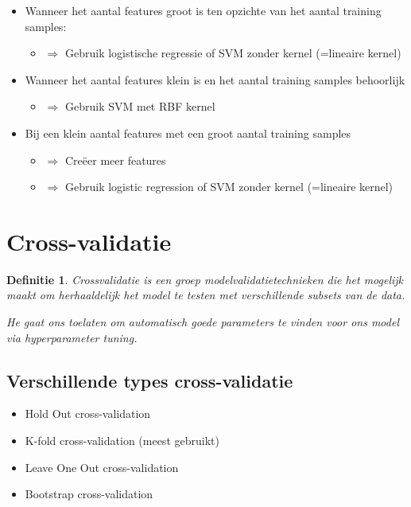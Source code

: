 \documentclass{article}
\newtheorem{theorem}{Definitie}[section]
\begin{document}
\begin{itemize}
    \item Wanneer het aantal features groot is ten opzichte van het aantal training samples:
    \begin{itemize}
        \item $\Rightarrow$ Gebruik logistische regressie of SVM zonder kernel (=lineaire kernel)
    \end{itemize}
    \item Wanneer het aantal features klein is en het aantal training samples behoorlijk
    \begin{itemize}
        \item $\Rightarrow$ Gebruik SVM met RBF kernel
    \end{itemize} 
    \item Bij een klein aantal features met een groot aantal training samples
    \begin{itemize}
        \item $\Rightarrow$ Creëer meer features
        \item $\Rightarrow$ Gebruik logistic regression of SVM zonder kernel (=lineaire kernel)
    \end{itemize} 
\end{itemize}

\section{Cross-validatie}

\begin{theorem}
    Crossvalidatie is een groep modelvalidatietechnieken die het mogelijk maakt om
    herhaaldelijk het model te testen met verschillende subsets van de data.

    He gaat ons toelaten om automatisch goede parameters te vinden voor ons model via hyperparameter tuning.
\end{theorem}


\subsection{Verschillende types cross-validatie}

\begin{itemize}
    \item Hold Out cross-validation
    \item K-fold cross-validation (meest gebruikt)
    \item Leave One Out cross-validation
    \item Bootstrap cross-validation
\end{itemize}
\end{document}
